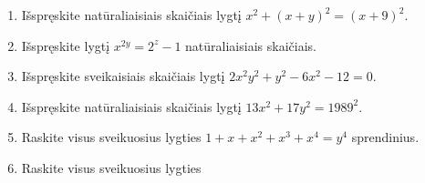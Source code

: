 \begin{enumerate}
  \item \text{[LitMo 1988]} Išspręskite natūraliaisiais skaičiais lygtį
    $x^2 + (x+y)^2 = (x+9)^2$. 
  \item \text{[LitMo 1989]} Išspręskite lygtį $x^{2y} = 2^z - 1$
    natūraliaisiais skaičiais.
  \item \text{[LitMo 1989]} Išspręskite sveikaisiais skaičiais lygtį
    $2x^2y^2 + y^2 - 6x^2 - 12 = 0.$
  \item \text{[LitMo 1989]} Išspręskite natūraliaisiais skaičiais lygtį
    $13x^2 + 17y^2 = 1989^2.$
  \item {} Raskite visus sveikuosius lygties
    $1+x+x^2+x^3+x^4 = y^4$ sprendinius.
  \item {} Raskite visus sveikuosius lygties 

\end{enumerate}

